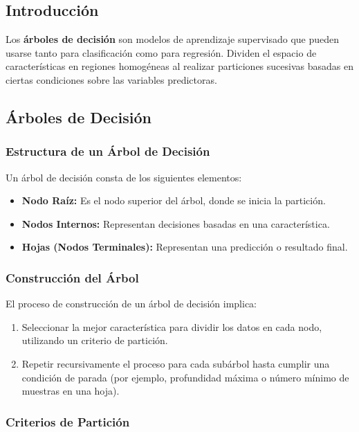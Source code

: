\documentclass[a4paper, 11pt]{article}
\begin{document}
\subsection{Introducción}

Los \textbf{árboles de decisión} son modelos de aprendizaje supervisado que pueden usarse tanto para clasificación como para regresión. Dividen el espacio de características en regiones homogéneas al realizar particiones sucesivas basadas en ciertas condiciones sobre las variables predictoras.

\subsection{Árboles de Decisión}

\subsubsection{Estructura de un Árbol de Decisión}

Un árbol de decisión consta de los siguientes elementos:

\begin{itemize}
    \item \textbf{Nodo Raíz:} Es el nodo superior del árbol, donde se inicia la partición.
    \item \textbf{Nodos Internos:} Representan decisiones basadas en una característica.
    \item \textbf{Hojas (Nodos Terminales):} Representan una predicción o resultado final.
\end{itemize}

\subsubsection{Construcción del Árbol}

El proceso de construcción de un árbol de decisión implica:

\begin{enumerate}
    \item Seleccionar la mejor característica para dividir los datos en cada nodo, utilizando un criterio de partición.
    \item Repetir recursivamente el proceso para cada subárbol hasta cumplir una condición de parada (por ejemplo, profundidad máxima o número mínimo de muestras en una hoja).
\end{enumerate}

\subsubsection{Criterios de Partición}
\end{document}
